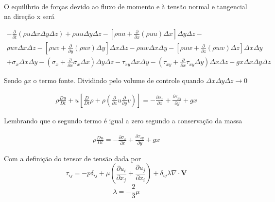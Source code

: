 \documentclass[]{article}
\begin{document}
O equilíbrio de forças devido ao fluxo de momento e à tensão normal e tangencial na direção x será

\begin{equation}
	\begin{aligned}
		-\frac{\partial}{\partial t} (\rho u \Delta x \Delta y \Delta z) + \rho uu \Delta y \Delta z - [\rho uu +	\frac{\partial}{\partial x}(\rho uu)\Delta x]\Delta y\Delta z - \\  \rho uv \Delta x \Delta z - [\rho uv +	\frac{\partial}{\partial y}(\rho uv)\Delta y]\Delta x\Delta z -   \rho uw \Delta x \Delta y - [\rho uw +	\frac{\partial}{\partial z}(\rho uw)\Delta z]\Delta x\Delta y \\ + \sigma_{x} \Delta x\Delta y - (\sigma_{x} + \frac{\partial}{\partial x}\sigma_{x} \Delta x) \Delta y\Delta z - \tau_{xy} \Delta x\Delta y - (\tau_{xy} + \frac{\partial}{\partial x}\tau_{xy} \Delta y) \Delta x\Delta z + gx \Delta x\Delta y\Delta z
	\end{aligned}
\end{equation}

Sendo $gx$ o termo fonte. Dividindo pelo volume de controle quando $\Delta x \Delta y  \Delta z \rightarrow 0 $

\begin{equation}
	\begin{aligned}
		\rho \frac{ Du}{Dt} + u[ \frac{D}{D t} \rho + \rho(\frac{\partial}{\partial x}u \frac{\partial}{\partial y}v)] = - \frac{\partial \sigma_{x}}{\partial x} +  \frac{\partial \tau_{xy}}{\partial y} + gx   
	\end{aligned}
\end{equation}

Lembrando que o segundo termo é igual a zero segundo a conservação da massa

\begin{equation}
	\begin{aligned}
		\rho \frac{ Du}{Dt} = - \frac{\partial \sigma_{x}}{\partial x} +  \frac{\partial \tau_{xy}}{\partial y} + gx   
	\end{aligned}
\end{equation}

Com a definição do tensor de tensão dada por
\begin{equation}
	\tau_{ij} = -p \delta_{ij} + \mu \left( \frac{\partial u_i}{\partial x_j} + \frac{\partial u_j}{\partial x_i} \right) + \delta_{ij} \lambda \nabla \cdot \mathbf{V}
\end{equation}
\begin{equation}
	\lambda = -\frac{2}{3} \mu
\end{equation}
\end{document}
